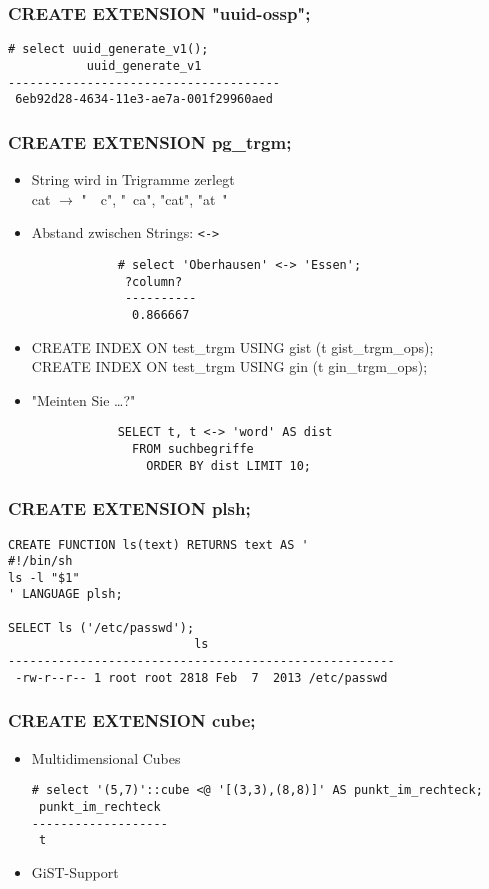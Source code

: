 \documentclass[utf8,hyperref={pdftex,colorlinks,linkcolor=black,citecolor=black,urlcolor=black,filecolor=black,plainpages=false},xcolor=table,hyperref]{beamer}
\begin{document}
\begin{frame}[containsverbatim]
	\frametitle{CREATE EXTENSION "{}uuid-ossp";}
	\begin{verbatim}
# select uuid_generate_v1();
           uuid_generate_v1           
--------------------------------------
 6eb92d28-4634-11e3-ae7a-001f29960aed
 \end{verbatim}
\end{frame}

\begin{frame}[containsverbatim]
	\frametitle{CREATE EXTENSION pg_trgm;}
	\begin{itemize}
		\item String wird in Trigramme zerlegt \\
			cat $\rightarrow$ "\ \ c", "\ ca", "cat", "{}at\ "
		\item Abstand zwischen Strings: \verb|<->|
			\begin{verbatim}
			# select 'Oberhausen' <-> 'Essen';
			 ?column? 
			 ----------
			  0.866667
			  \end{verbatim}
		  \item CREATE INDEX ON test_trgm USING gist (t gist_trgm_ops); \\
			CREATE INDEX ON test_trgm USING gin (t gin_trgm_ops);
		\item "Meinten Sie \dots?"\begin{verbatim}
			SELECT t, t <-> 'word' AS dist
			  FROM suchbegriffe
			    ORDER BY dist LIMIT 10;
			    \end{verbatim}
		    
	\end{itemize}
\end{frame}

\begin{frame}[containsverbatim]
	\frametitle{CREATE EXTENSION plsh;}
	\begin{verbatim}
CREATE FUNCTION ls(text) RETURNS text AS '
#!/bin/sh
ls -l "$1"
' LANGUAGE plsh;

SELECT ls ('/etc/passwd');
                          ls                          
------------------------------------------------------
 -rw-r--r-- 1 root root 2818 Feb  7  2013 /etc/passwd
\end{verbatim}
\end{frame}

\begin{frame}[containsverbatim]
	\frametitle{CREATE EXTENSION cube;}
	\begin{itemize}
		\item Multidimensional Cubes
			\begin{verbatim}
# select '(5,7)'::cube <@ '[(3,3),(8,8)]' AS punkt_im_rechteck;
 punkt_im_rechteck 
-------------------
 t
 \end{verbatim}
 \item GiST-Support
 \end{itemize}
\end{frame}
\end{document}
